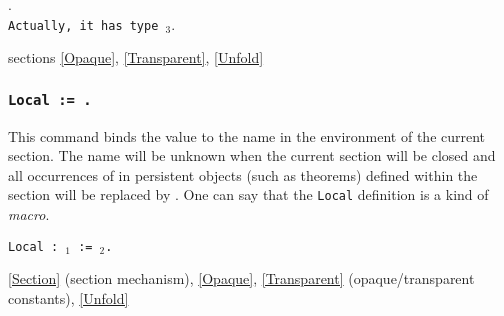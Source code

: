 \begin{ErrMsgs}
\item {}.\\
    \texttt{Actually, it has type {\term$_3$}}.
\end{ErrMsgs}

\SeeAlso sections \ref{Opaque}, \ref{Transparent}, \ref{Unfold}

\subsubsection{\tt Local {\ident} := {\term}.}
This command binds the value {\term} to the name {\ident} in the
environment of the current section. The name {\ident} will be unknown
when the current section will be closed and all occurrences of
{\ident} in persistent objects (such as theorems) defined within the
section will be replaced by \term.  One can say that the {\tt Local}
definition is a kind of {\em macro}.

\begin{ErrMsgs}
\item {}
\end{ErrMsgs}

\begin{Variants}
\item {\tt Local {\ident} : {\term$_1$} := {\term$_2$}.}
\end{Variants}

\SeeAlso \ref{Section} (section mechanism), \ref{Opaque},
\ref{Transparent} (opaque/transparent constants), \ref{Unfold}

%



